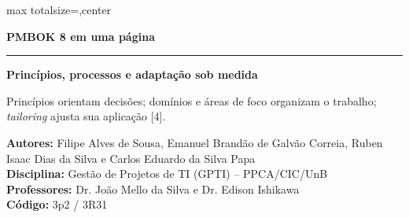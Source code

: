 \documentclass[12pt]{article}
\newcommand{\corpo}{\fontsize{16}{21}\selectfont}
\newcommand{\blocoautores}{%
  \textbf{Autores:} Filipe Alves de Sousa, Emanuel Brandão de Galvão Correia, Ruben Isaac Dias da Silva e Carlos Eduardo da Silva Papa\\
  \textbf{Disciplina:} Gestão de Projetos de TI (GPTI) -- PPCA/CIC/UnB\\
  \textbf{Professores:} Dr. João Mello da Silva e Dr. Edison Ishikawa\\
  \textbf{Código:} 3p2 / 3R31}
\begin{document}
\thispagestyle{empty}
\corpo

\noindent\begin{adjustbox}{max totalsize={\textwidth}{\textheight},center}
\parbox{\textwidth}{%
\raggedright

\begin{tcolorbox}[enhanced,colback=exLine,colframe=exLine,coltext=white,arc=2mm,
  left=6mm,right=6mm,top=4mm,bottom=4mm]
{\centering\fontsize{32}{37}\selectfont\bfseries PMBOK 8 em uma página\par}
\vspace{2.5mm}
\noindent\textcolor{white}{\rule{\linewidth}{0.5pt}}\par
\vspace{2.5mm}
\noindent\begin{minipage}[t]{0.48\linewidth}\raggedright
{\fontsize{18}{22}\selectfont\bfseries Princípios, processos e adaptação sob medida\par}
\vspace{1.5mm}
{\fontsize{14}{18}\selectfont Princípios orientam decisões; domínios e áreas de foco organizam o trabalho; \textit{tailoring} ajusta sua aplicação [4].\par}
\end{minipage}\hfill
\begin{minipage}[t]{0.48\linewidth}\raggedright
{\fontsize{13}{17}\selectfont\blocoautores\par}
\end{minipage}
\end{tcolorbox}

\vspace{4mm}

}
\end{adjustbox}
\end{document}
